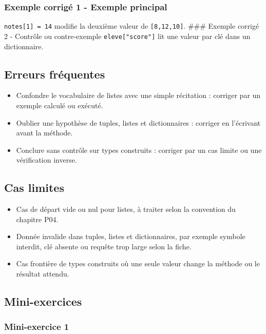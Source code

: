 \subsubsection{Exemple corrigé 1 - Exemple principal}

\texttt{notes{[}1{]}\ =\ 14} modifie la deuxième valeur de
\texttt{{[}8,12,10{]}}. \#\#\# Exemple corrigé 2 - Contrôle ou
contre-exemple \lstinline|eleve["score"]| lit une valeur par clé dans
un dictionnaire.

\subsection{Erreurs fréquentes}

\begin{itemize}
\tightlist
\item
  Confondre le vocabulaire de listes avec une simple récitation :
  corriger par un exemple calculé ou exécuté.
\item
  Oublier une hypothèse de tuples, listes et dictionnaires : corriger en
  l'écrivant avant la méthode.
\item
  Conclure sans contrôle sur types construits : corriger par un cas
  limite ou une vérification inverse.
\end{itemize}

\subsection{Cas limites}

\begin{itemize}
\tightlist
\item
  Cas de départ vide ou nul pour listes, à traiter selon la convention
  du chapitre P04.
\item
  Donnée invalide dans tuples, listes et dictionnaires, par exemple
  symbole interdit, clé absente ou requête trop large selon la fiche.
\item
  Cas frontière de types construits où une seule valeur change la
  méthode ou le résultat attendu.
\end{itemize}

\subsection{Mini-exercices}

\subsubsection{Mini-exercice 1}

